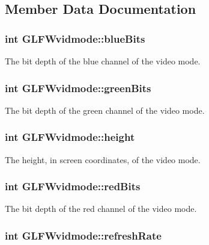 \subsection{\-Member \-Data \-Documentation}
\hypertarget{structGLFWvidmode_af310977f58d2e3b188175b6e3d314047}{
\subsubsection[{blue\-Bits}]{\setlength{\rightskip}{0pt plus 5cm}int {\bf \-G\-L\-F\-Wvidmode\-::blue\-Bits}}}\label{structGLFWvidmode_af310977f58d2e3b188175b6e3d314047}
\-The bit depth of the blue channel of the video mode. \hypertarget{structGLFWvidmode_a292fdd281f3485fb3ff102a5bda43faa}{
\subsubsection[{green\-Bits}]{\setlength{\rightskip}{0pt plus 5cm}int {\bf \-G\-L\-F\-Wvidmode\-::green\-Bits}}}\label{structGLFWvidmode_a292fdd281f3485fb3ff102a5bda43faa}
\-The bit depth of the green channel of the video mode. \hypertarget{structGLFWvidmode_ac65942a5f6981695517437a9d571d03c}{
\subsubsection[{height}]{\setlength{\rightskip}{0pt plus 5cm}int {\bf \-G\-L\-F\-Wvidmode\-::height}}}\label{structGLFWvidmode_ac65942a5f6981695517437a9d571d03c}
\-The height, in screen coordinates, of the video mode. \hypertarget{structGLFWvidmode_a6066c4ecd251098700062d3b735dba1b}{
\subsubsection[{red\-Bits}]{\setlength{\rightskip}{0pt plus 5cm}int {\bf \-G\-L\-F\-Wvidmode\-::red\-Bits}}}\label{structGLFWvidmode_a6066c4ecd251098700062d3b735dba1b}
\-The bit depth of the red channel of the video mode. \hypertarget{structGLFWvidmode_a791bdd6c7697b09f7e9c97054bf05649}{
\subsubsection[{refresh\-Rate}]{\setlength{\rightskip}{0pt plus 5cm}int {\bf \-G\-L\-F\-Wvidmode\-::refresh\-Rate}}}\label{structGLFWvidmode_a791bdd6c7697b09f7e9c97054bf05649}
